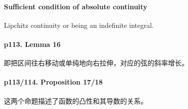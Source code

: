   \paragraph{Sufficient condition of absolute continuity}
    Lipchitz continuity or being an indefinite integral.

  \paragraph{p113. Lemma 16}
    即把区间往右移动或单纯地向右拉伸，对应的弦的斜率增长。

  \paragraph{p113/114. Proposition 17/18}
    这两个命题描述了函数的凸性和其导数的关系。
  




